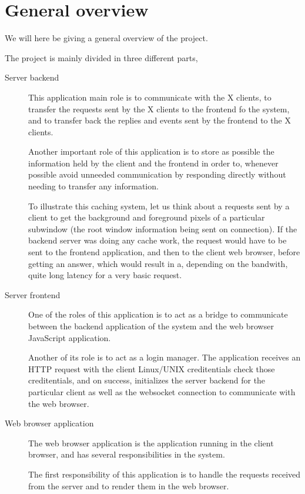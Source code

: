 \section{General overview}
We will here be giving a general overview of the project.

The project is mainly divided in three different parts, 
\begin{description}
\item[Server backend]
  This application main role is to communicate with the X clients, 
  to transfer the requests sent by the X clients to the frontend fo the system, 
  and to transfer back the replies and events sent by the frontend to the 
  X clients. 
  
  Another important role of this application is to store as possible 
  the information held by the client and the frontend in order to, whenever 
  possible avoid unneeded communication by responding directly without 
  needing to transfer any information.

  To illustrate this caching system, let us think about a requests sent by a 
  client to get the background and foreground pixels of a particular 
  subwindow (the root window information being sent on connection). If the 
  backend server was doing any cache work, the request would have to be 
  sent to the frontend application, and then to the client web browser, before 
  getting an answer, which would result in a, depending on the bandwith, 
  quite long latency for a very basic request.   
  
\item[Server frontend]
  One of the roles of this application  is to act as a bridge to
  communicate between the backend application of the system 
  and the web browser JavaScript application.

  Another of its role is to act as a login manager. The application 
  receives an HTTP request with the client Linux/UNIX creditentials 
  check those creditentials, and on success, initializes the server 
  backend for the particular client as well as the websocket connection 
  to communicate with the web browser.
\item[Web browser application]
  The web browser application is the application running in the client 
  browser, and has several responsibilities in the system.

  The first responsibility of this application is to handle the 
  requests received from the server and to render them in the web 
  browser.
\end{description}



